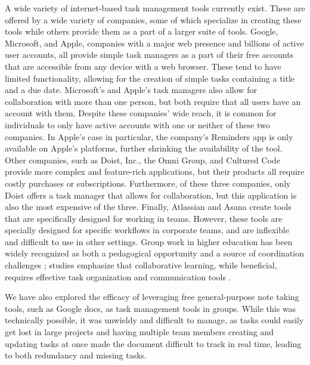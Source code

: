 \documentclass[11pt]{report}
\begin{document}
A wide variety of internet-based task management tools currently exist. These are offered by a wide variety of companies, some of which specialize in creating these tools while others provide them as a part of a larger suite of tools.
Google, Microsoft, and Apple, companies with a major web presence and billions of active user accounts, all provide simple task managers as a part of their free accounts that are accessible from any device with a web browser. These tend to have limited functionality, allowing for the creation of simple tasks containing a title and a due date. Microsoft’s and Apple’s task managers also allow for collaboration with more than one person, but both require that all users have an account with them. Despite these companies’ wide reach, it is common for individuals to only have active accounts with one or neither of these two companies. In Apple’s case in particular, the company’s Reminders app is only available on Apple’s platforms, further shrinking the availability of the tool.
Other companies, such as Doist, Inc., the Omni Group, and Cultured Code provide more complex and feature-rich applications, but their products all require costly purchases or subscriptions. Furthermore, of these three companies, only Doist offers a task manager that allows for collaboration, but this application is also the most expensive of the three.
Finally, Atlassian and Asana create tools that are specifically designed for working in teams. However, these tools are specially designed for specific workflows in corporate teams, and are inflexible and difficult to use in other settings. Group work in higher education has been widely recognized as both a pedagogical opportunity and a source of coordination challenges \citep{johnson2009educational}; studies emphasize that collaborative learning, while beneficial, requires effective task organization and communication tools \citep{dunlosky2013improving}.

We have also explored the efficacy of leveraging free general-purpose note taking tools, such as Google docs, as task management tools in groups. While this was technically possible, it was unwieldy and difficult to manage, as tasks could easily get lost in large projects and having multiple team members creating and updating tasks at once made the document difficult to track in real time, leading to both redundancy and missing tasks.
\end{document}
